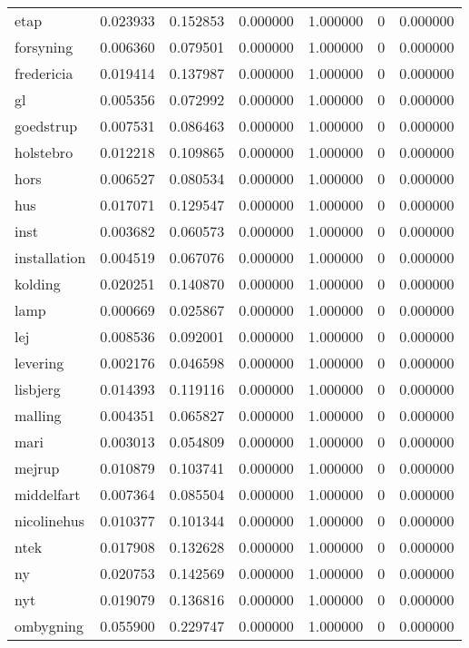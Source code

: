 \begin{landscape}
\begin{longtable}[h!]{lrrllrr}
etap & 0.023933 & 0.152853 & 0.000000 & 1.000000 & 0 & 0.000000 \\
forsyning & 0.006360 & 0.079501 & 0.000000 & 1.000000 & 0 & 0.000000 \\
fredericia & 0.019414 & 0.137987 & 0.000000 & 1.000000 & 0 & 0.000000 \\
gl & 0.005356 & 0.072992 & 0.000000 & 1.000000 & 0 & 0.000000 \\
goedstrup & 0.007531 & 0.086463 & 0.000000 & 1.000000 & 0 & 0.000000 \\
holstebro & 0.012218 & 0.109865 & 0.000000 & 1.000000 & 0 & 0.000000 \\
hors & 0.006527 & 0.080534 & 0.000000 & 1.000000 & 0 & 0.000000 \\
hus & 0.017071 & 0.129547 & 0.000000 & 1.000000 & 0 & 0.000000 \\
inst & 0.003682 & 0.060573 & 0.000000 & 1.000000 & 0 & 0.000000 \\
installation & 0.004519 & 0.067076 & 0.000000 & 1.000000 & 0 & 0.000000 \\
kolding & 0.020251 & 0.140870 & 0.000000 & 1.000000 & 0 & 0.000000 \\
lamp & 0.000669 & 0.025867 & 0.000000 & 1.000000 & 0 & 0.000000 \\
lej & 0.008536 & 0.092001 & 0.000000 & 1.000000 & 0 & 0.000000 \\
levering & 0.002176 & 0.046598 & 0.000000 & 1.000000 & 0 & 0.000000 \\
lisbjerg & 0.014393 & 0.119116 & 0.000000 & 1.000000 & 0 & 0.000000 \\
malling & 0.004351 & 0.065827 & 0.000000 & 1.000000 & 0 & 0.000000 \\
mari & 0.003013 & 0.054809 & 0.000000 & 1.000000 & 0 & 0.000000 \\
mejrup & 0.010879 & 0.103741 & 0.000000 & 1.000000 & 0 & 0.000000 \\
middelfart & 0.007364 & 0.085504 & 0.000000 & 1.000000 & 0 & 0.000000 \\
nicolinehus & 0.010377 & 0.101344 & 0.000000 & 1.000000 & 0 & 0.000000 \\
ntek & 0.017908 & 0.132628 & 0.000000 & 1.000000 & 0 & 0.000000 \\
ny & 0.020753 & 0.142569 & 0.000000 & 1.000000 & 0 & 0.000000 \\
nyt & 0.019079 & 0.136816 & 0.000000 & 1.000000 & 0 & 0.000000 \\
ombygning & 0.055900 & 0.229747 & 0.000000 & 1.000000 & 0 & 0.000000 \\

\end{longtable}
\end{landscape}
